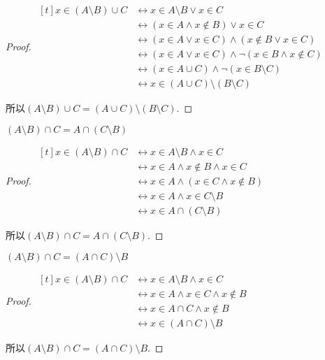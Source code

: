 \begin{proof}
	$\begin{aligned}[t]
		x\in (A\setminus B)\cup C & \leftrightarrow x\in A\setminus B\vee x\in C \\
		& \leftrightarrow (x\in A\wedge x\notin B)\vee x\in C \\
		& \leftrightarrow (x\in A\vee x\in C)\wedge (x\notin B\vee x\in C) \\
		& \leftrightarrow (x\in A\vee x\in C)\wedge \neg(x\in B\wedge x\notin C) \\
		& \leftrightarrow (x\in A\cup C)\wedge \neg(x\in B\setminus C) \\
		& \leftrightarrow x\in (A\cup C)\setminus (B\setminus C)
	\end{aligned}$
	
	所以$(A\setminus B)\cup C=(A\cup C)\setminus (B\setminus C)$.
\end{proof}

\begin{proposition}
	$(A\setminus B)\cap C=A\cap (C\setminus B)$
\end{proposition}

\begin{proof}
	$\begin{aligned}[t]
		x\in (A\setminus B)\cap C & \leftrightarrow x\in A\setminus B\wedge x\in C \\
		& \leftrightarrow x\in A\wedge x\notin B\wedge x\in C \\
		& \leftrightarrow x\in A\wedge (x\in C\wedge x\notin B) \\
		& \leftrightarrow x\in A\wedge x\in C\setminus B \\
		& \leftrightarrow x\in A\cap (C\setminus B)
	\end{aligned}$
	
	所以$(A\setminus B)\cap C=A\cap (C\setminus B)$.
\end{proof}

\begin{proposition}
	$(A\setminus B)\cap C=(A\cap C)\setminus B$
\end{proposition}

\begin{proof}
	$\begin{aligned}[t]
		x\in (A\setminus B)\cap C & \leftrightarrow x\in A\setminus B\wedge x\in C \\
		& \leftrightarrow x\in A\wedge x\in C\wedge x\notin B \\
		& \leftrightarrow x\in A\cap C\wedge x\notin B \\
		& \leftrightarrow x\in (A\cap C)\setminus B
	\end{aligned}$
	
	所以$(A\setminus B)\cap C=(A\cap C)\setminus B$.
\end{proof}

